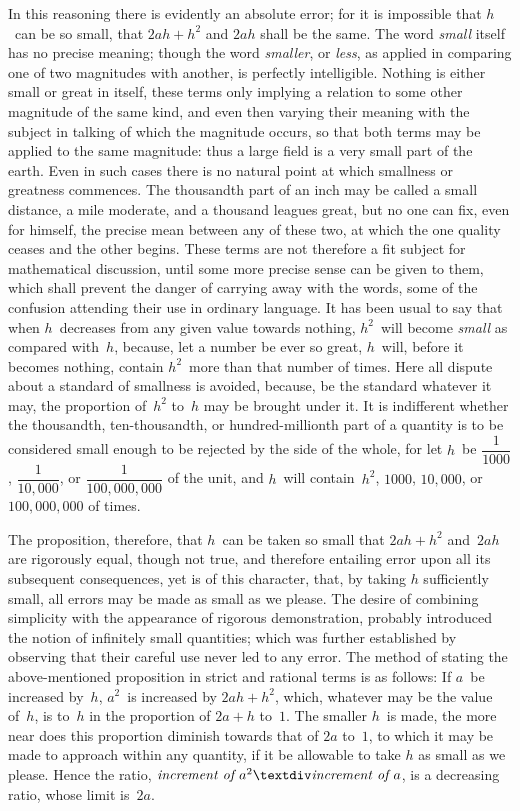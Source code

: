\documentclass[12pt]{book}[2005/09/16]
\newcommand{\Pagelabel}[1]{\phantomsection\label{page:#1}}
\newcommand{\PageSep}[1]{\Pagelabel{#1}\ignorespaces}
\renewcommand{\(}{{\upshape(}}
\renewcommand{\)}{{\upshape)}}
\begin{document}
In this reasoning there is evidently an absolute
error; for it is impossible that $h$~can be so small, that
$2ah + h^{2}$ and $2ah$ shall be the same. The word \emph{small}
itself has no precise meaning; though the word \emph{smaller},
%
or \emph{less}, as applied in comparing one of two magnitudes
with another, is perfectly intelligible. Nothing is
either small or great in itself, these terms only implying
a relation to some other magnitude of the same
kind, and even then varying their meaning with the
subject in talking of which the magnitude occurs, so
that both terms may be applied to the same magnitude:
thus a large field is a very small part of the
earth. Even in such cases there is no natural point
at which smallness or greatness commences. The
thousandth part of an inch may be called a small distance,
a mile moderate, and a thousand leagues great,
but no one can fix, even for himself, the precise mean
between any of these two, at which the one quality
ceases and the other begins. These terms are not
therefore a fit subject for mathematical discussion,
until some more precise sense can be given to them,
which shall prevent the danger of carrying away with
the words, some of the confusion attending their use
in ordinary language. It has been usual to say that
when $h$~decreases from any given value towards nothing,
$h^{2}$~will become \emph{small} as compared with~$h$, because,
\PageSep{13}
let a number be ever so great, $h$~will, before it becomes
nothing, contain $h^{2}$~more than that number of
times. Here all dispute about a standard of smallness
is avoided, because, be the standard whatever it may,
the proportion of~$h^{2}$ to~$h$ may be brought under it. It
is indifferent whether the thousandth, ten-thousandth,
or hundred-millionth part of a quantity is to be considered
small enough to be rejected by the side of the
whole, for let $h$~be $\dfrac{1}{1000}$, $\dfrac{1}{10,000}$, or $\dfrac{1}{100,000,000}$ of the
unit, and $h$~will contain~$h^{2}$, $1000$, $10,000$, or $100,000,000$
of times.

The proposition, therefore, that $h$~can be taken so
small that $2ah + h^{2}$ and~$2ah$ are rigorously equal,
though not true, and therefore entailing error upon
all its subsequent consequences, yet is of this character,
that, by taking $h$ sufficiently small, all errors may
be made as small as we please. The desire of combining
simplicity with the appearance of rigorous
demonstration, probably introduced the notion of infinitely
small quantities; which was further established
by observing that their careful use never led to
any error. The method of stating the above-mentioned
proposition in strict and rational terms is as follows:
If $a$~be increased by~$h$, $a^{2}$~is increased by $2ah + h^{2}$,
which, whatever may be the value of~$h$, is to~$h$ in the
proportion of $2a + h$ to~$1$. The smaller $h$~is made,
the more near does this proportion diminish towards
that of $2a$ to~$1$, to which it may be made to approach
within any quantity, if it be allowable to take $h$ as
small as we please. Hence the ratio, $\emph{increment of } a^{2} ÷ \emph{increment of } a$, is a decreasing ratio, whose limit is~$2a$.
\end{document}
